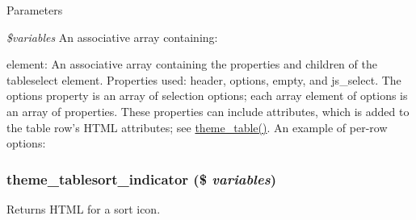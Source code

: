 \begin{DoxyParams}{Parameters}
\item[{\em \$variables}]An associative array containing:
\begin{DoxyItemize}
\item element: An associative array containing the properties and children of the tableselect element. Properties used: header, options, empty, and js\_\-select. The options property is an array of selection options; each array element of options is an array of properties. These properties can include attributes, which is added to the table row's HTML attributes; see \hyperlink{group__themeable_ga9e35aa108c35f87b588197138a51823d}{theme\_\-table()}. An example of per-\/row options: 
 
\end{DoxyItemize}\end{DoxyParams}
\hypertarget{group__themeable_ga06cbe52fad2dac8196f8c89118c3975d}{
\subsubsection[{theme\_\-tablesort\_\-indicator}]{\setlength{\rightskip}{0pt plus 5cm}theme\_\-tablesort\_\-indicator (\$ {\em variables})}}
\label{group__themeable_ga06cbe52fad2dac8196f8c89118c3975d}
Returns HTML for a sort icon.


